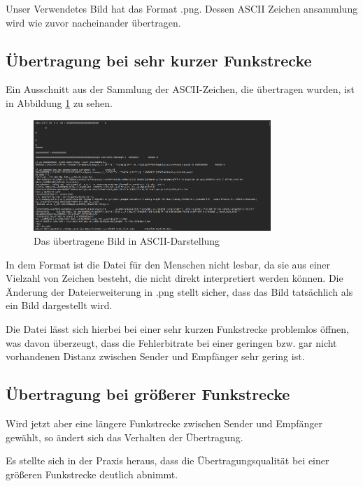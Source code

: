 Unser Verwendetes Bild hat das Format .png. Dessen ASCII Zeichen ansammlung wird wie zuvor nacheinander übertragen.
\subsection{Übertragung bei sehr kurzer Funkstrecke}
Ein Ausschnitt aus der Sammlung der ASCII-Zeichen, die übertragen wurden, ist in Abbildung \ref{fig:Task2c} zu sehen.

\begin{figure}[H]
    \centering
    \includegraphics[width=0.8\textwidth]{Pictures/memeASCII.png}
    \caption{Das übertragene Bild in ASCII-Darstellung}
    \label{fig:Task2c}
\end{figure}

In dem Format ist die Datei für den Menschen nicht lesbar, da sie aus einer Vielzahl von Zeichen besteht, die nicht direkt interpretiert werden können. 
Die Änderung der Dateierweiterung in .png stellt sicher, dass das Bild tatsächlich als ein Bild dargestellt wird. 

Die Datei lässt sich hierbei bei einer sehr kurzen Funkstrecke problemlos öffnen, was davon überzeugt, dass die Fehlerbitrate bei einer geringen bzw. gar nicht vorhandenen Distanz zwischen Sender und Empfänger sehr gering ist.

\subsection{Übertragung bei größerer Funkstrecke}
Wird jetzt aber eine längere Funkstrecke zwischen Sender und Empfänger gewählt, so ändert sich das Verhalten der Übertragung. 

Es stellte sich in der Praxis heraus, dass die Übertragungsqualität bei einer größeren Funkstrecke deutlich abnimmt.

